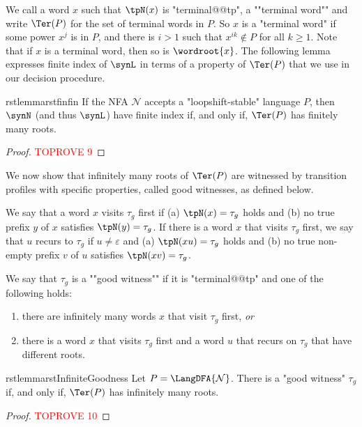 \documentclass[a4paper,USenglish,cleveref,autoref,thm-restate]{lipics-v2021}
\newcommand{\mc}[1]{\ensuremath{\mathcal{#1}}}
\newcommand{\N}{\mc{N}}
\begin{document}
\AP
We call a word $x$ such that $\tpN(x)$ is "terminal@@tp", a ""terminal word"" and write $\Ter(P)$ for the set of terminal words in $P$. So $x$ is a "terminal word" if some power $x^j$ is in $P$, and there is $i > 1$ such that $x^{ik} \notin P$ for all $k \ge 1$. Note that if $x$ is a terminal word, then so is $\wordroot{x}$.
The following lemma expresses finite index of $\synL$ in terms of a property of $\Ter(P)$ that we use in our decision procedure.

\begin{restatable}{rstlemma}{rstfinfin}
  \label{lem:fin2fin}
  If the NFA $\N$ accepts a "loopshift-stable" language $P$, then $\synN$ (and thus $\synL$) have finite index if, and only if, $\Ter(P)$ has finitely many roots.
\end{restatable}

\begin{proof}\textcolor{red}{TOPROVE 9}\end{proof}

We now show that infinitely many roots of $\Ter(P)$ are witnessed by transition profiles with specific properties, called good witnesses, as defined below.

We say that a word $x$ visits $\tau_g$ first if (a) $\tpN(x)= \tau_g$ holds and (b) no true prefix $y$ of $x$ satisfies $\tpN(y) = \tau_g$.
If there is a word $x$ that visits $\tau_g$ first, we say that $u$ recurs to $\tau_g$ if $u \neq \varepsilon$ and (a) $\tpN(xu)= \tau_g$ holds and (b) no true non-empty prefix $v$ of $u$ satisfies $\tpN(xv) = \tau_g$.

\AP
We say that $\tau_g$ is a ""good witness"" if it is "terminal@@tp" and one of the following holds:
\begin{enumerate}
  \item there are infinitely many words $x$ that visit $\tau_g$ first, \emph{or}
  \item there is a word $x$ that visits $\tau_g$ first and a word $u$ that recurs on $\tau_g$ that have different roots.
\end{enumerate}

\begin{restatable}{rstlemma}{rstInfiniteGoodness}
  \label{lem:InfiniteGoodness}
  Let $P = \LangDFA{\N}$. There is a "good witness" $\tau_g$ if, and only if, $\Ter(P)$ has infinitely many roots.
\end{restatable}

\begin{proof}\textcolor{red}{TOPROVE 10}\end{proof}
\end{document}
